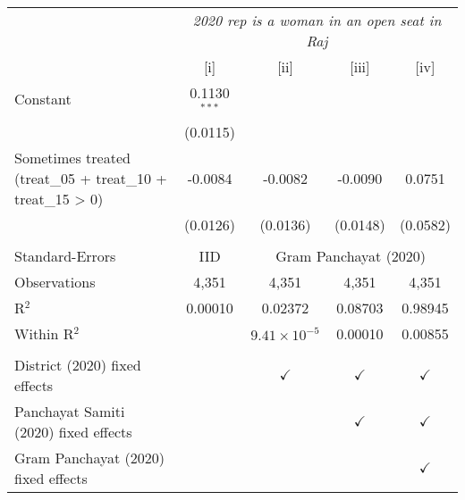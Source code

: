 
\begingroup
\centering
\begin{tabular}{lcccc}
   \toprule
    & \multicolumn{4}{c}{\textit{2020 rep is a woman in an open seat in Raj}}\\
                                                                & [i]            & [ii]                  & [iii]         & [iv]\\  
   \midrule 
   Constant                                                     & 0.1130$^{***}$ &                       &               &   \\   
                                                                & (0.0115)       &                       &               &   \\   
   Sometimes treated (treat\_05 + treat\_10 + treat\_15 > 0)    & -0.0084        & -0.0082               & -0.0090       & 0.0751\\   
                                                                & (0.0126)       & (0.0136)              & (0.0148)      & (0.0582)\\   
    \\
   Standard-Errors & IID & \multicolumn{3}{c}{Gram Panchayat (2020)} \\ 
   Observations                                                 & 4,351          & 4,351                 & 4,351         & 4,351\\  
   R$^2$                                                        & 0.00010        & 0.02372               & 0.08703       & 0.98945\\  
   Within R$^2$                                                 &                & $9.41\times 10^{-5}$  & 0.00010       & 0.00855\\  
    \\
   District (2020) fixed effects                                &                & $\checkmark$          & $\checkmark$  & $\checkmark$\\   
   Panchayat Samiti (2020) fixed effects                        &                &                       & $\checkmark$  & $\checkmark$\\   
   Gram Panchayat (2020) fixed effects                          &                &                       &               & $\checkmark$\\   
   \bottomrule
\end{tabular}
\par\endgroup


